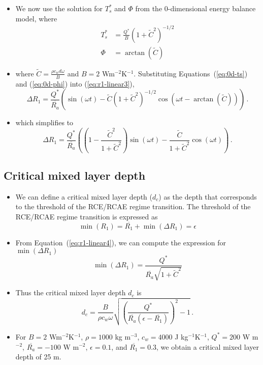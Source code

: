 \documentclass{ametsocV5}
\begin{document}
\begin{itemize}
  \item We now use the solution for $T_{s}^{*}$ and $\Phi$ from the 0-dimensional energy balance model, where
        \begin{align}
          T_{s}^{*} &= \frac{Q^{*}}{B}\left(1+\tilde{C}^{2}\right)^{-1/2} \label{eq:0d-ts} \\
          \Phi &= \arctan\left(\tilde{C}\right) \label{eq:0d-phi}
        \end{align}
  \item where $\tilde{C}=\frac{\rho c_{w} d \omega}{B}$ and $B=2$ Wm$^{-2}$K$^{-1}$. Substituting Equations~(\ref{eq:0d-ts}) and (\ref{eq:0d-phi}) into (\ref{eq:r1-linear3}),
        \begin{equation} \label{eq:r1-linear4}
          \Delta R_{1} = \frac{Q^{*}}{\overline{R_{a}}}\left(\sin(\omega t) -\tilde{C}\left(1+\tilde{C}^{2}\right)^{-1/2}\cos(\omega t - \arctan(\tilde{C})) \right) \, .
        \end{equation}
  \item which simplifies to
        \begin{equation} \label{eq:r1-linear4}
          \Delta R_{1} = \frac{Q^{*}}{\overline{R_{a}}}\left(\left(1-\frac{\tilde{C}^{2}}{1+\tilde{C}^{2}}\right)\sin(\omega t) -\frac{\tilde{C}}{1+\tilde{C}^{2}}\cos(\omega t) \right) \, .
        \end{equation}
\end{itemize}

\subsection{Critical mixed layer depth}
\begin{itemize}
  \item We can define a critical mixed layer depth ($d_{c}$) as the depth that corresponds to the threshold of the RCE/RCAE regime transition. The threshold of the RCE/RCAE regime transition is expressed as
        \begin{equation}
          \min(R_{1}) = \overline{R_{1}} + \min(\Delta R_{1}) = \epsilon
        \end{equation}
  \item From Equation~(\ref{eq:r1-linear4}), we can compute the expression for $\min(\Delta R_{1})$
        \begin{equation}
          \min(\Delta R_{1}) = \frac{Q^{*}}{\overline{R_{a}}\sqrt{1+\tilde{C}^{2}}}
        \end{equation}
  \item Thus the critical mixed layer depth $d_{c}$ is
        \begin{equation}
          d_{c} = \frac{B}{\rho c_{w} \omega}\sqrt{\left(\frac{Q^{*}}{\overline{R_{a}}(\epsilon-\overline{R_{1}})}\right)^{2}-1} \, .
        \end{equation}
\item For $B=2$ Wm$^{-2}$K$^{-1}$, $\rho=1000$ kg m$^{-3}$, $c_{w}=4000$ J kg$^{-1} $K$^{-1}$, $Q^{*}=200$ W m$^{-2}$, $\overline{R_{a}}=-100$ W m$^{-2}$, $\epsilon=0.1$, and $\overline{R_{1}}=0.3$, we obtain a critical mixed layer depth of 25 m.

\end{itemize}
\end{document}
